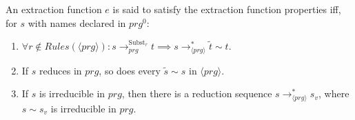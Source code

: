 \begin{definition}
An extraction function $e$ is said to satisfy the extraction function properties iff, for $s$ with names declared in $prg^0$:

\begin{enumerate}
\item $\forall r \not\in Rules(\langle prg \rangle): s \longrightarrow^{\textrm{Subst}_r}_{prg} t \implies s \longrightarrow^*_{\langle prg \rangle} \widetilde{t} \sim t$.

\item If $s$ reduces in $prg$, so does every $\widetilde{s} \sim s$ in $\langle prg \rangle$.

\item If $s$ is irreducible in $prg$, then there is a reduction sequence $s \longrightarrow^*_{\langle prg \rangle} s_v$, where $s \sim s_v$ is irreducible in $prg$.

\end{enumerate}

\end{definition}

